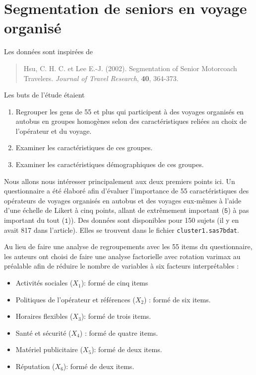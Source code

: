 \documentclass[
  11pt,
  letterpaper,
]{book}
\providecommand{\tightlist}{%
  \setlength{\itemsep}{0pt}\setlength{\parskip}{0pt}}
\theoremstyle{definition}
\theoremstyle{definition}
\theoremstyle{definition}
\theoremstyle{remark}
\begin{document}
\hypertarget{segmentation-de-seniors-en-voyage-organisuxe9}{%
\section{Segmentation de seniors en voyage organisé}\label{segmentation-de-seniors-en-voyage-organisuxe9}}

Les données sont inspirées de

\begin{quote}
Hsu, C. H. C. et Lee E.-J. (2002). Segmentation of Senior Motorcoach Travelers. \emph{Journal of Travel Research}, \textbf{40}, 364-373.
\end{quote}

Les buts de l'étude étaient

\begin{enumerate}
\def\labelenumi{\arabic{enumi})}
\tightlist
\item
  Regrouper les gens de 55 et plus qui participent à des voyages organisés en autobus en groupes homogènes selon des caractéristiques reliées au choix de l'opérateur et du voyage.
\item
  Examiner les caractéristiques de ces groupes.
\item
  Examiner les caractéristiques démographiques de ces groupes.
\end{enumerate}

Nous allons nous intéresser principalement aux deux premiers points ici. Un questionnaire a été élaboré afin d'évaluer l'importance de 55 caractéristiques des opérateurs de voyages organisés en autobus et des voyages eux-mêmes à l'aide d'une échelle de Likert à cinq points, allant de extrêmement important (\(\texttt{5}\)) à pas important du tout (\(\texttt{1}\))). Des données sont disponibles pour 150 sujets (il y en avait 817 dans l'article). Elles se trouvent dans le fichier \texttt{cluster1.sas7bdat}.

Au lieu de faire une analyse de regroupements avec les 55 items du questionnaire, les auteurs ont choisi de faire une analyse factorielle avec rotation varimax au préalable afin de réduire le nombre de variables à six facteurs interprétables :

\begin{itemize}
\tightlist
\item
  Activités sociales (\(X_1\)): formé de cinq items
\item
  Politiques de l'opérateur et références (\(X_2\)) : formé de six items.
\item
  Horaires flexibles (\(X_3\)): formé de trois items.
\item
  Santé et sécurité (\(X_4\)) : formé de quatre items.
\item
  Matériel publicitaire (\(X_5\)): formé de deux items.
\item
  Réputation (\(X_6\)): formé de deux items.
\end{itemize}
\end{document}

